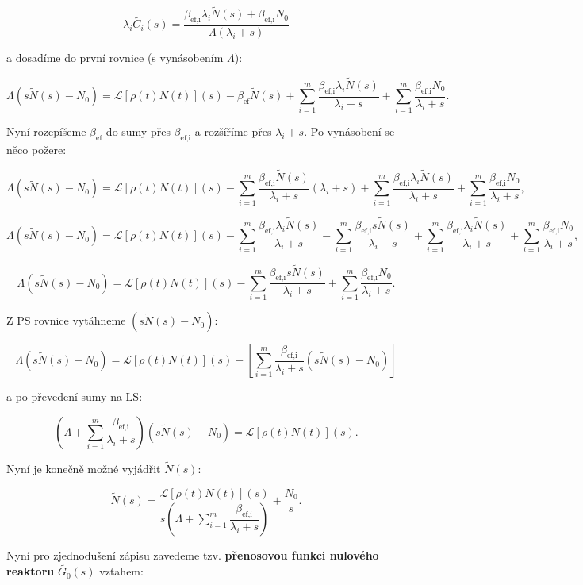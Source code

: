$$ \lambda_i \tilde{C_i}(s) = \dfrac{\beta_{\text{ef,i}} \lambda_i \tilde{N}(s) + \beta_{\text{ef,i}}N_0}{\Lambda(\lambda_i + s)} $$

a dosadíme do první rovnice (s vynásobením $\Lambda$):

$$ \Lambda (s \tilde{N}(s) - N_0) = \mathcal{L}[\rho(t) N(t)](s) - \beta_{\text{ef}} \tilde{N}(s) + \sum_{i=1}^m \dfrac{\beta_{\text{ef,i}} \lambda_i \tilde{N}(s)}{\lambda_i + s} + \sum_{i=1}^m \dfrac{\beta_{\text{ef,i}}N_0}{\lambda_i + s}. $$

Nyní rozepíšeme $\beta_{\text{ef}}$ do sumy přes $\beta_{\text{ef,i}}$ a rozšíříme přes $\lambda_i + s$. Po vynásobení se něco požere:

$$ \Lambda (s \tilde{N}(s) - N_0) = \mathcal{L}[\rho(t) N(t)](s) - \sum_{i=1}^m \dfrac{\beta_{\text{ef,i}} \tilde{N}(s)}{\lambda_i + s}(\lambda_i + s) + \sum_{i=1}^m \dfrac{\beta_{\text{ef,i}} \lambda_i \tilde{N}(s)}{\lambda_i + s} + \sum_{i=1}^m \dfrac{\beta_{\text{ef,i}}N_0}{\lambda_i + s}, $$

$$ \Lambda (s \tilde{N}(s) - N_0) = \mathcal{L}[\rho(t) N(t)](s) - \sum_{i=1}^m \dfrac{\beta_{\text{ef,i}} \lambda_i \tilde{N}(s)}{\lambda_i + s} - \sum_{i=1}^m \dfrac{\beta_{\text{ef,i}} s \tilde{N}(s)}{\lambda_i + s} + \sum_{i=1}^m \dfrac{\beta_{\text{ef,i}} \lambda_i \tilde{N}(s)}{\lambda_i + s} + \sum_{i=1}^m \dfrac{\beta_{\text{ef,i}}N_0}{\lambda_i + s}, $$

$$ \Lambda (s \tilde{N}(s) - N_0) = \mathcal{L}[\rho(t) N(t)](s) - \sum_{i=1}^m \dfrac{\beta_{\text{ef,i}} s \tilde{N}(s)}{\lambda_i + s} + \sum_{i=1}^m \dfrac{\beta_{\text{ef,i}}N_0}{\lambda_i + s}. $$

Z PS rovnice vytáhneme $(s \tilde{N}(s) - N_0)$:

$$ \Lambda (s \tilde{N}(s) - N_0) = \mathcal{L}[\rho(t) N(t)](s) - \left [ \sum_{i=1}^m \dfrac{\beta_{\text{ef,i}}}{\lambda_i + s}(s \tilde{N}(s) - N_0) \right ]$$

a po převedení sumy na LS:

$$ \left ( \Lambda + \sum_{i=1}^m \dfrac{\beta_{\text{ef,i}}}{\lambda_i + s} \right ) (s \tilde{N}(s) - N_0) = \mathcal{L}[\rho(t) N(t)](s). $$

Nyní je konečně možné vyjádřit $\tilde{N}(s)$:

$$ \tilde{N}(s) = \dfrac{\mathcal{L}[\rho(t) N(t)](s)}{s \left ( \Lambda + \sum_{i=1}^m \dfrac{\beta_{\text{ef,i}}}{\lambda_i + s} \right )} + \dfrac{N_0}{s}. $$

Nyní pro zjednodušení zápisu zavedeme tzv. \textbf{přenosovou funkci nulového reaktoru} $\tilde{G_0}(s)$ vztahem:

